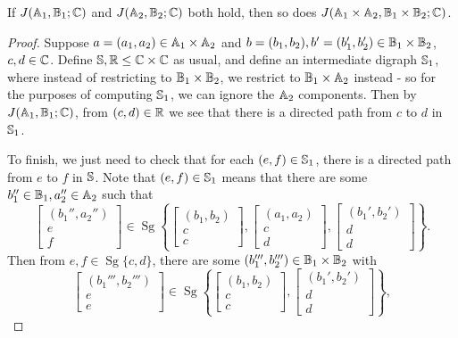 \documentclass[letterpaper,11pt]{article}
\DeclareMathOperator{\Sg}{Sg}
\begin{document}
\begin{lem} If $J(\mathbb{A}_1,\mathbb{B}_1;\mathbb{C})$ and $J(\mathbb{A}_2,\mathbb{B}_2;\mathbb{C})$ both hold, then so does $J(\mathbb{A}_1\times \mathbb{A}_2,\mathbb{B}_1\times\mathbb{B}_2;\mathbb{C})$.
\end{lem}
\begin{proof} Suppose $a = (a_1,a_2) \in \mathbb{A}_1 \times \mathbb{A}_2$ and $b = (b_1, b_2), b' = (b_1', b_2') \in \mathbb{B}_1\times \mathbb{B}_2$, $c,d \in \mathbb{C}$. Define $\mathbb{S}, \mathbb{R} \le \mathbb{C} \times \mathbb{C}$ as usual, and define an intermediate digraph $\mathbb{S}_1$, where instead of restricting to $\mathbb{B}_1 \times \mathbb{B}_2$, we restrict to $\mathbb{B}_1 \times \mathbb{A}_2$ instead - so for the purposes of computing $\mathbb{S}_1$, we can ignore the $\mathbb{A}_2$ components. Then by $J(\mathbb{A}_1,\mathbb{B}_1;\mathbb{C})$, from $(c,d) \in \mathbb{R}$ we see that there is a directed path from $c$ to $d$ in $\mathbb{S}_1$.

To finish, we just need to check that for each $(e,f) \in \mathbb{S}_1$, there is a directed path from $e$ to $f$ in $\mathbb{S}$. Note that $(e,f) \in \mathbb{S}_1$ means that there are some $b_1'' \in \mathbb{B}_1, a_2'' \in \mathbb{A}_2$ such that
\[
\begin{bmatrix} (b_1'', a_2'')\\ e\\ f \end{bmatrix} \in \Sg\left\{\begin{bmatrix}(b_1,b_2)\\ c\\ c\end{bmatrix},\begin{bmatrix}(a_1,a_2)\\ c\\ d\end{bmatrix}, \begin{bmatrix}(b_1',b_2')\\ d\\ d\end{bmatrix}\right\}.
\]
Then from $e,f \in \Sg\{c,d\}$, there are some $(b_1''',b_2''') \in \mathbb{B}_1 \times \mathbb{B}_2$ with
\[
\begin{bmatrix} (b_1''', b_2''')\\ e\\ e \end{bmatrix} \in \Sg\left\{\begin{bmatrix}(b_1,b_2)\\ c\\ c\end{bmatrix}, \begin{bmatrix}(b_1',b_2')\\ d\\ d\end{bmatrix}\right\},
\]
\end{proof}
\end{document}
